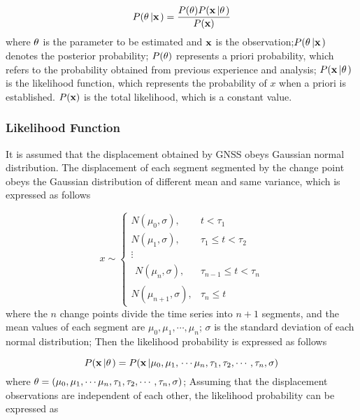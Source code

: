 \documentclass{svjour3}                     %
\begin{document}
\begin{equation}\label{eq_bayesian_inference}
P({\bf{\theta }}\left| {\bf{x}} \right.) = \frac{{P({\bf{\theta }})P({\bf{x}}\left| {\bf{\theta }} \right.)}}{{P({\bf{x}})}}
\end{equation}
where $\bf{\theta }$ is the parameter to be estimated and $\bf{x}$ is the observation;$P({\bf{\theta }}\left| {\bf{x}} \right.)$ denotes the posterior probability; $P({\bf{\theta }})$ represents a priori probability, which refers to the probability obtained from previous experience and analysis;
$P({\bf{x}}\left| {\bf{\theta }} \right.)$ is the likelihood function, which represents the probability of $x$ when a priori is established. ${P({\bf{x}})}$ is the total likelihood, which is a constant value.

\subsubsection{Likelihood Function}
It is assumed that the displacement obtained by GNSS obeys Gaussian normal distribution. The displacement of each segment segmented by the change point obeys the Gaussian distribution of different mean and same variance, which is expressed as follows

\begin{equation}\label{eq_ts_cps}
x \sim \left\{ {\begin{array}{*{20}{r}}
	{N({\mu _0},\sigma ),}&{t < {\tau _1}}\\
	{N({\mu _1},\sigma ),}&{{\tau _1} \le t < {\tau _2}}\\
	\vdots &{}\\
	{\begin{array}{*{20}{c}}
		{N({\mu _n},\sigma ),}
		\end{array}}&{{\tau _{n - 1}} \le t < {\tau _n}}\\
	{N({\mu _{n + 1}},\sigma ),}&{{\tau _n} \le t}
	\end{array}} \right.
\end{equation}
where the $n$ change points divide the time series into $n+1$ segments, and the mean values of each segment are ${\mu _0},{\mu _1},\cdots,{\mu _n}$; $\sigma$ is the standard deviation of each normal distribution; Then the likelihood probability is expressed as follows

\begin{equation}\label{eq_likelihood}
P({\bf{x}}\left| {\bf{\theta }} \right.) = P({\bf{x}}\left| {{\mu_0},{\mu_1},} \right. \cdots {\mu_n},{\tau _1},{\tau _2}, \cdots ,{\tau _n},\sigma )
\end{equation}
where ${\bf{\theta }}=({{\mu_0},{\mu_1},} \cdots {\mu_n},{\tau _1},{\tau _2}, \cdots ,{\tau _n},\sigma) $; Assuming that the displacement observations are independent of each other, the likelihood probability can be expressed as
\end{document}
